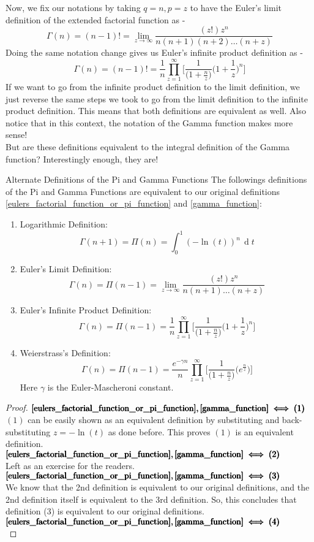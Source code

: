 Now, we fix our notations by taking $q=n,p=z$ to have the Euler's limit definition of the extended factorial function as - $$ \boxed{\Gamma(n)=(n-1)!=\lim_{z\to\infty}\frac{(z!)z^n}{n(n+1)(n+2)\dots(n+z)}} $$
Doing the same notation change gives us Euler's infinite product definition as - $$ \boxed{\Gamma(n)=(n-1)!=\frac{1}{n}\prod_{z=1}^{\infty}\bigg[ \frac{1}{\big(1+\frac{n}{z}\big)}\bigg( 1+\frac{1}{z}\bigg)^n\bigg]} $$
If we want to go from the infinite product definition to the limit definition, we just reverse the same steps we took to go from the limit definition to the infinite product definition. This means that both definitions are equivalent as well. Also notice that in this context, the notation of the Gamma function makes more sense!\\
But are these definitions equivalent to the integral definition of the Gamma function? Interestingly enough, they are!
\begin{Definition}{Alternate Definitions of the Pi and Gamma Functions}
	The followings definitions of the Pi and Gamma Functions are equivalent to our original definitions \eqref{eulers_factorial_function_or_pi_function} and \eqref{gamma_function}:
	\begin{enumerate}
		\item Logarithmic Definition: $$\Gamma(n+1)=\Pi(n)= \int_0^1(-\ln(t))^n\,\operatorname{d}t$$
		\item Euler's Limit Definition: \[ \Gamma(n)=\Pi(n-1)=\lim_{z\to\infty}\frac{(z!)z^n}{n(n+1)\dots(n+z)} \]
		\item Euler's Infinite Product Definition:\[ \Gamma(n)=\Pi(n-1)=\frac{1}{n}\prod_{z=1}^{\infty}\bigg[ \frac{1}{\big(1+\frac{n}{z}\big)}\bigg( 1+\frac{1}{z}\bigg)^n\bigg] \]
		\item Weierstrass's Definition: \[ \Gamma(n)=\Pi(n-1)=\frac{e^{-\gamma n}}{n}\prod_{z=1}^{\infty}\bigg[ \frac{1}{\big(1+\frac{n}{z}\big)}\bigg( e^{\frac{n}{z}}\bigg)\bigg] \] Here $\gamma$ is the Euler-Mascheroni constant.
	\end{enumerate}
\end{Definition}
\begin{proof}
	$ \pmb{\eqref{eulers_factorial_function_or_pi_function},\eqref{gamma_function}\iff(1)}$\\
	$(1)$ can be easily shown as an equivalent definition by substituting and back-substituting $z=-\ln(t)$ as done before. This proves $(1)$ is an equivalent definition.\\
	$ \pmb{\eqref{eulers_factorial_function_or_pi_function},\eqref{gamma_function}\iff(2)}$\\
	Left as an exercise for the readers.\\
	$ \pmb{\eqref{eulers_factorial_function_or_pi_function},\eqref{gamma_function}\iff(3)}$\\
	We know that the 2nd definition is equivalent to our original definitions, and the 2nd definition itself is equivalent to the 3rd definition. So, this concludes that definition (3) is equivalent to our original definitions.\\
	$ \pmb{\eqref{eulers_factorial_function_or_pi_function},\eqref{gamma_function}\iff(4)}$\\
	
\end{proof}
